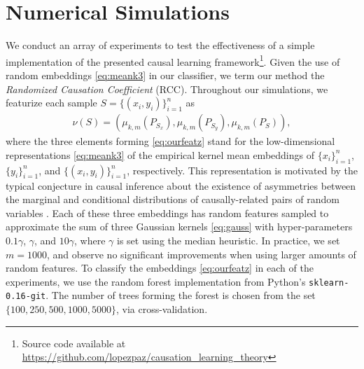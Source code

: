 \documentclass[twoside,11pt,a4paper]{article}
\begin{document}
\section{Numerical Simulations}\label{sec:exps}
We conduct an array of experiments to test the effectiveness of a simple
implementation of the presented causal learning framework\footnote{Source code
available at
{\small\url{https://github.com/lopezpaz/causation_learning_theory}}}. Given the
use of random embeddings \eqref{eq:meank3} in our classifier, we term our
method the \emph{Randomized Causation Coefficient} (RCC).  Throughout our
simulations, we featurize each sample $S = \{(x_{i},y_{i})\}_{i=1}^{n}$ as
\begin{align}\label{eq:ourfeatz}
  \nu(S) = (\mu_{k,m}(P_{S_x}), \mu_{k,m}(P_{S_y}), \mu_{k,m}(P_{S})),
\end{align}
where the three elements forming \eqref{eq:ourfeatz} stand for the
low-dimensional representations \eqref{eq:meank3} of the empirical kernel mean
embeddings of $\{x_i\}_{i=1}^n$, $\{y_i\}_{i=1}^n$, and
$\{(x_i,y_i)\}_{i=1}^n$, respectively. This representation is motivated by the
typical conjecture in causal inference about the existence of asymmetries
between the marginal and conditional distributions of causally-related pairs of
random variables \citep{Scholkopf12:Causal}. Each of these three embeddings has
random features sampled to approximate the sum of three Gaussian kernels
\eqref{eq:gauss} with hyper-parameters $0.1\gamma$, $\gamma$, and $10\gamma$,
where $\gamma$ is set using the median heuristic.  In practice, we set $m =
1000$, and observe no significant improvements when using larger amounts of
random features. To classify the embeddings \eqref{eq:ourfeatz} in each of the
experiments, we use the random forest implementation from Python's
\texttt{sklearn-0.16-git}. The number of trees forming the forest is chosen
from the set $\{100,250,500,1000,5000\}$, via cross-validation.
\end{document}
